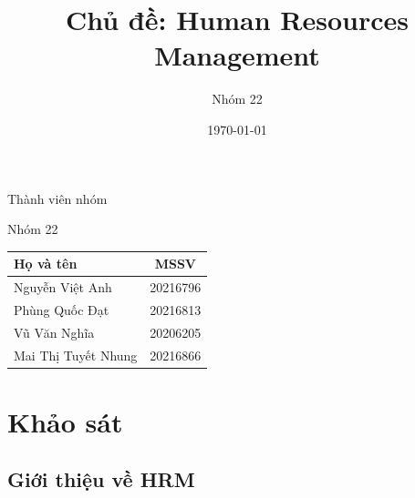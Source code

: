 \documentclass{beamer}
\title[{\makebox[.15\paperwidth]{Human Resources Management}}]{Chủ đề: Human Resources Management}
\author[Nhóm 22]{Nhóm 22}
\date[Data Warehouse \& BI]{\today}
\begin{document}
\begin{frame}
\titlepage
\end{frame}
\begin{frame}{Thành viên nhóm}
\begin{block}{Nhóm 22}
\centering
\begin{tabular} {|l|c|}
\hline
Họ và tên & MSSV \\
\hline
Nguyễn Việt Anh & 20216796 \\
Phùng Quốc Đạt & 20216813 \\
Vũ Văn Nghĩa & 20206205 \\
Mai Thị Tuyết Nhung & 20216866 \\
\hline
\end{tabular}
\end{block}
\end{frame}
\section{Khảo sát}
\subsection{Giới thiệu về HRM}
\end{document}

